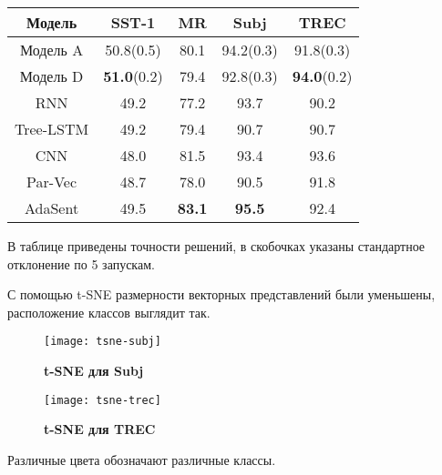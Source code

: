  \label{tab:title} 
\begin{tabular}{|c|c|c|c|c|}
\hline
Модель    & SST-1               & MR           & Subj         & TREC  \\ \hline
Модель A  & 50.8(0.5)           & 80.1         & 94.2(0.3)    & 91.8(0.3) \\
Модель D  & \textbf{51.0}(0.2)  & 79.4         & 92.8(0.3)    & \textbf{94.0}(0.2)\\ \hline
RNN\cite{DBLP:journals/corr/ZhaoLP15}    & 49.2               & 77.2         & 93.7         & 90.2  \\
Tree-LSTM\cite{DBLP:journals/corr/TaiSM15}& 49.2              & 79.4         & 90.7         & 90.7  \\
CNN\cite{DBLP:journals/corr/Kim14f}    & 48.0                 & 81.5         & 93.4         & 93.6  \\
Par-Vec\cite{DBLP:journals/corr/LeM14}& 48.7                  & 78.0         & 90.5         & 91.8  \\
AdaSent\cite{DBLP:journals/corr/ZhaoLP15}& 49.5               & \textbf{83.1}& \textbf{95.5}& 92.4 \\ \hline
\end{tabular}

\vspace{5mm}

В таблице приведены точности решений, в скобочках указаны стандартное отклонение по 5 запускам.

С помощью t-SNE размерности векторных представлений были уменьшены, расположение классов выглядит так.

\begin{figure}[H]
\texttt{[image: tsne-subj]}
\caption{\textbf{t-SNE для Subj}}
\label{fig:context_ex}
\end{figure}
\vspace{5mm}

\begin{figure}[H]
\texttt{[image: tsne-trec]}
\caption{\textbf{t-SNE для TREC}}
\label{fig:context_ex}
\end{figure}
\vspace{5mm}

Различные цвета обозначают различные классы.

